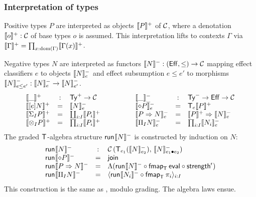 \documentclass[acmsmall,review,anonymous]{acmart}\settopmatter{printfolios=true,printccs=false,printacmref=false}
\begin{document}
\subsubsection{Interpretation of types}

Positive types $P$ are interpreted as objects $\denp P$ of $\CC$,
where a denotation $\denp o : \CC$ of base types $o$ is assumed.
This interpretation lifts to contexts $\Gamma$ via $\denp \Gamma =
\prod_{x:\dom(\Gamma)} \denp{\Gamma(x)}$.

Negative types $N$ are interpreted
as functors $\denn N : (\Eff,\leq) \to \CC$ mapping
effect classifiers $e$ to objects $\Denn N e$ and effect subsumption $e
\leq e'$ to morphisms $\Denn N {e \leq e'} : \Denn N e \to \Denn N {e'}$.
\[
\begin{array}{lcl}
  \denp\_ & : & \PTy \to \CC \\
  \denp{\thunkty e N} & = & \Denn N e \\
  \denp{\sumt I P} & = & \coprod_{i:I} \denp{P_i} \\
  \denp{\tupt I P} & = & \prod_{i:I} \denp{P_i} \\
\end{array}
\qquad\qquad
\begin{array}{lcl}
  \Denn\_\_ & : & \NTy \to \Eff \to \CC \\
  \Denn{\diamond P} e & = & \T[e] \denp P \\
  \Denn{P \To N}   e & = & \denp P \To \Denn N e \\
  \Denn{\rect I N} e & = & \prod_{i:I} \Denn{N_i}e \\
\end{array}
\]
The graded $\T$-algebra structure $\run{\denn N}$ is constructed by
induction on $N$:
\[
\begin{array}{lcl}
  \run{\denn N} & : & \Hom {\T[e_1](\Denn N {e_2})} {\Denn N {e_1 \bu e_2}} \\
  \run{\denn {\diamond P}} & = & \tjoin \\
  \run{\denn {P \To N}}   & = & \Lambda(\run{\denn N} \circ
                                \fmap[\T]\teval \circ \strengthr) \\
  \run{\denn {\rect I N}} & = & \langle \run{\denn{N_i}} \comp
                                \fmap[\T]{\pi_i} \rangle_{i:I} \\
\end{array}
\]
This construction is the same as \citet{levy:hosc06}, modulo grading.
The algebra laws ensue.
\end{document}
